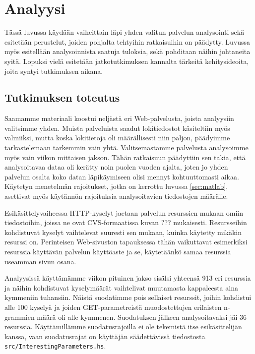 
\chapter{Analyysi}

Tässä luvussa käydään vaiheittain läpi yhden valitun palvelun analysointi sekä esitetään perustelut, joiden pohjalta tehtyihin ratkaisuihin on päädytty. 
Luvussa myös esitellään analysoinnista saatuja tuloksia, sekä pohditaan näihin johtaneita syitä. Lopuksi vielä esitetään jatkotutkimuksen kannalta 
tärkeitä kehitysideoita, joita syntyi tutkimuksen aikana. 
 
\section{Tutkimuksen toteutus}

Saamamme materiaali koostui neljästä eri Web-palvelusta, joista analyysiin valitsimme yhden. Muista palveluista saadut lokitiedostot käsiteltiin
myös valmiiksi, mutta koska lokitietoja oli määrällisesti niin paljon, päädyimme tarkastelemaan tarkemmin vain yhtä. Valitsemastamme palvelusta
analysoimme myös vain viikon mittaisen jakson. Tähän ratkaisuun päädyttiin sen takia, että analysoitavaa dataa oli kerätty noin puolen vuoden ajalta,
joten jo yhden palvelun osalta koko datan läpikäymiseen olisi mennyt kohtuuttomasti aikaa. Käytetyn menetelmän rajoitukset, jotka on kerrottu luvussa \ref{sec:matlab},
asettivat myös käytännön rajoituksia analysoitavien tiedostojen määrälle.
 
Esikäsittelyvaiheessa HTTP-kyselyt jaetaan palvelun resurssien mukaan omiin tiedostoihin, joissa ne ovat CVS-formaatissa kuvan ??? mukaisesti. 
Resursseihin kohdistuvat kyselyt vaihtelevat suuresti sen mukaan, kuinka käytetty mikäkin resurssi on. Perinteisen Web-sivuston tapauksessa tähän
vaikuttavat esimerkiksi resurssia käyttävän palvelun käyttöaste ja se, käytetäänkö samaa resurssia useamman sivun osana. 

Analyysissä käyttämämme viikon pituinen jakso sisälsi yhteensä 913 eri resurssia ja näihin kohdistuvat kyselymäärät vaihtelivat muutamasta kappaleesta
aina kymmeniin tuhansiin. Näistä suodatimme pois sellaiset resurssit, joihin kohdistui alle 100 kyselyä ja joiden GET-parametreistä muodostettujen
erilaisten n-grammien määrä oli alle kymmenen. Suodatuksen jälkeen analysoitavaksi jäi 36 resurssia. Käyttämillämme suodatusrajoilla ei ole tekemistä 
itse esikäsittelijän kanssa, vaan suodatusrajat on käyttäjän säädettävissä tiedostosta \texttt{src/InterestingParameters.hs}.
    
